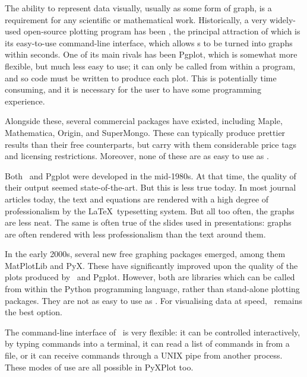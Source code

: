 The ability to represent data visually, usually as some form of graph, is a
requirement for any scientific or mathematical work.  Historically, a very
widely-used open-source plotting program has been \gnuplot, the principal
attraction of which is its easy-to-use command-line interface, which allows
\datafile s to be turned into graphs within seconds. One of its main rivals has
been {\sc Pgplot}, which is somewhat more flexible, but much less
easy to use; it can only be called from within a program, and so code must be
written to produce each plot.  This is potentially time consuming, and it is
necessary for the user to have some programming experience.

Alongside these, several commercial packages have existed, including {\sc
Maple}, {\sc Mathematica}, {\sc
Origin}, and {\sc SuperMongo}.  These can
typically produce prettier results than their free counterparts, but carry with
them considerable price tags and licensing restrictions. Moreover, none of
these are as easy to use as \gnuplot.

Both \gnuplot\ and Pgplot were developed in the mid-1980s. At that time, the
quality of their output seemed state-of-the-art. But this is less true today.
In most journal articles today, the text and equations are rendered with a high
degree of professionalism by the \LaTeX\ typesetting system. But all too often,
the graphs are less neat.  The same is often true of the slides used in
presentations: graphs are often rendered with less professionalism than the
text around them.

In the early 2000s, several new free graphing packages emerged, among them {\sc
MatPlotLib} and {\sc PyX}.  These have
significantly improved upon the quality of the plots produced by \gnuplot\ and
Pgplot. However, both are libraries which can be called from within the Python
programming language, rather than stand-alone plotting packages. They are not
as easy to use as \gnuplot.  For visualising data at speed, \gnuplot\ remains the
best option.

The command-line interface of \gnuplot\ is very flexible: it can be controlled
interactively, by typing commands into a terminal, it can read a list of
commands in from a file, or it can receive commands through a UNIX pipe from
another process. These modes of use are all possible in PyXPlot too.

